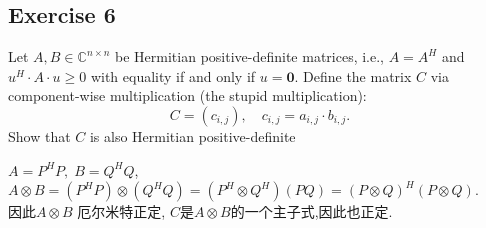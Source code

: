 \documentclass[11pt]{ctexart}
\theoremstyle{definition}
\numberwithin{equation}{section}
\theoremstyle{definition}
\theoremstyle{remark}
\begin{document}
\subsection{Exercise 6}
Let $A, B \in \mathbb{C}^{n \times n}$ be Hermitian positive-definite matrices, i.e., $A = A^H$ and $u^H \cdot A \cdot u \geq 0$ with equality if and only if $u = \mathbf{0}$. Define the matrix $C$ via component-wise multiplication (the stupid multiplication):
$$
C = (c_{i,j}),\quad c_{i,j} = a_{i,j} \cdot b_{i,j}.
$$
Show that $C$ is also Hermitian positive-definite 
\begin{aaa}
    $A=P^HP, \; B=Q^HQ$, $A\otimes B=(P^HP)\otimes (Q^HQ)=(P^H\otimes Q^H)(PQ)=(P\otimes Q)^H(P\otimes Q)$.\\
    因此$A\otimes B$ 厄尔米特正定, $C$是$A\otimes B$的一个主子式,因此也正定.
\end{aaa}
\end{document}
